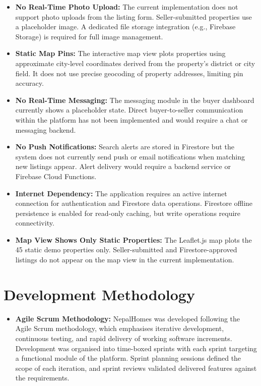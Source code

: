 \documentclass[12pt,a4paper]{report}
\begin{document}
\begin{itemize}[leftmargin=2.5em]
  \item \textbf{No Real-Time Photo Upload:}
    The current implementation does not support photo uploads from the listing
    form. Seller-submitted properties use a placeholder image. A dedicated file
    storage integration (e.g., Firebase Storage) is required for full image
    management.

  \item \textbf{Static Map Pins:}
    The interactive map view plots properties using approximate city-level
    coordinates derived from the property's district or city field. It does not
    use precise geocoding of property addresses, limiting pin accuracy.

  \item \textbf{No Real-Time Messaging:}
    The messaging module in the buyer dashboard currently shows a placeholder
    state. Direct buyer-to-seller communication within the platform has not been
    implemented and would require a chat or messaging backend.

  \item \textbf{No Push Notifications:}
    Search alerts are stored in Firestore but the system does not currently send
    push or email notifications when matching new listings appear. Alert delivery
    would require a backend service or Firebase Cloud Functions.

  \item \textbf{Internet Dependency:}
    The application requires an active internet connection for authentication and
    Firestore data operations. Firestore offline persistence is enabled for
    read-only caching, but write operations require connectivity.

  \item \textbf{Map View Shows Only Static Properties:}
    The Leaflet.js map plots the 45 static demo properties only. Seller-submitted
    and Firestore-approved listings do not appear on the map view in the current
    implementation.
\end{itemize}

\section{Development Methodology}

\begin{itemize}[leftmargin=2.5em]
  \item \textbf{Agile Scrum Methodology:}
    NepalHomes was developed following the Agile Scrum methodology, which
    emphasises iterative development, continuous testing, and rapid delivery of
    working software increments. Development was organised into time-boxed sprints
    with each sprint targeting a functional module of the platform. Sprint planning
    sessions defined the scope of each iteration, and sprint reviews validated
    delivered features against the requirements.
\end{itemize}
\end{document}
